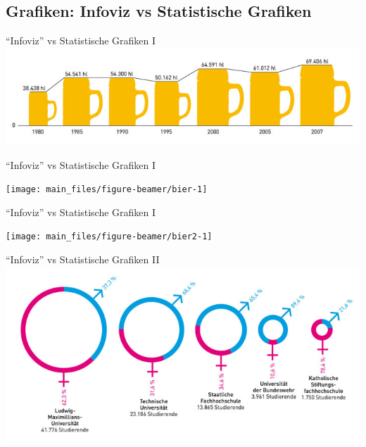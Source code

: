 \documentclass[
  10pt,
  ignorenonframetext,
]{beamer}
\begin{document}
\subsection{Grafiken: Infoviz vs Statistische
Grafiken}\label{grafiken-infoviz-vs-statistische-grafiken}

\begin{frame}{``Infoviz'' vs Statistische Grafiken I}
\label{infoviz-vs-statistische-grafiken-i}
\includegraphics[width = \textwidth]{pics/2-bier.jpg}
\end{frame}

\begin{frame}{``Infoviz'' vs Statistische Grafiken I}
\label{infoviz-vs-statistische-grafiken-i-1}
\scriptsize

\begin{center}\texttt{[image: main\_files/figure-beamer/bier-1]} \end{center}

\normalsize
\end{frame}

\begin{frame}{``Infoviz'' vs Statistische Grafiken I}
\label{infoviz-vs-statistische-grafiken-i-2}
\scriptsize

\begin{center}\texttt{[image: main\_files/figure-beamer/bier2-1]} \end{center}

\normalsize
\end{frame}

\begin{frame}{``Infoviz'' vs Statistische Grafiken II}
\label{infoviz-vs-statistische-grafiken-ii}
\includegraphics[width = \textwidth]{pics/2-studenten.jpg}
\end{frame}
\end{document}
